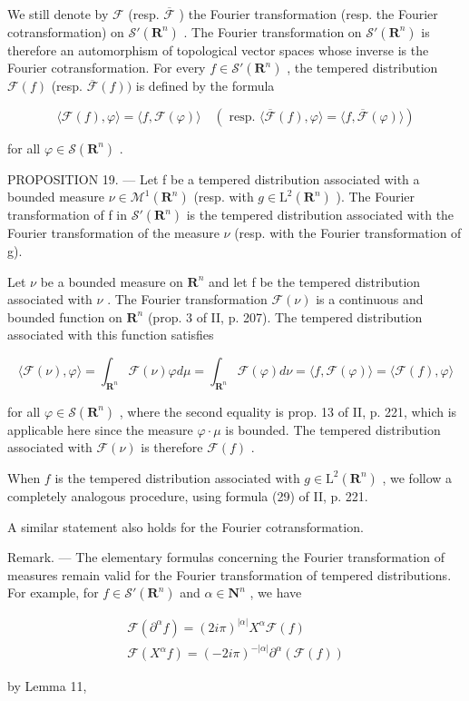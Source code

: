 We still denote by \(\mathcal{F}\) (resp. \(\overline{\mathcal{F}}\) ) the Fourier transformation (resp. the Fourier cotransformation) on \(\mathcal{S}'(\mathbf{R}^n)\) . The Fourier transformation on \(\mathcal{S}'(\mathbf{R}^n)\) is therefore an automorphism of topological vector spaces whose inverse is the Fourier cotransformation. For every \(f \in \mathcal{S}'(\mathbf{R}^n)\) , the tempered distribution \(\mathcal{F}(f)\) (resp. \(\overline{\mathcal{F}}(f) )\) is defined by the formula

\[
\langle \mathcal {F} (f), \varphi \rangle = \langle f, \mathcal {F} (\varphi) \rangle \quad (\text { resp. } \langle \overline {{\mathcal {F}}} (f), \varphi \rangle = \langle f, \overline {{\mathcal {F}}} (\varphi) \rangle)
\]

for all \(\varphi\in\mathcal{S}(\mathbf{R}^{n})\) .

PROPOSITION 19. --- Let f be a tempered distribution associated with a bounded measure \(\nu \in \mathcal{M}^{1}(\mathbf{R}^{n})\) (resp. with \(g \in \mathrm{L}^{2}(\mathbf{R}^{n})\) ). The Fourier transformation of f in \(\mathcal{S}'(\mathbf{R}^{n})\) is the tempered distribution associated with the Fourier transformation of the measure \(\nu\) (resp. with the Fourier transformation of g).

Let \(\nu\) be a bounded measure on \(\mathbf{R}^{n}\) and let f be the tempered distribution associated with \(\nu\) . The Fourier transformation \(\mathcal{F}(\nu)\) is a continuous and bounded function on \(\mathbf{R}^{n}\) (prop. 3 of II, p. 207). The tempered distribution associated with this function satisfies

\[
\langle \mathcal {F} (\nu), \varphi \rangle = \int_ {\mathbf {R} ^ {n}} \mathcal {F} (\nu) \varphi d \mu = \int_ {\mathbf {R} ^ {n}} \mathcal {F} (\varphi) d \nu = \langle f, \mathcal {F} (\varphi) \rangle = \langle \mathcal {F} (f), \varphi \rangle
\]

for all \(\varphi\in\mathcal{S}(\mathbf{R}^{n})\) , where the second equality is prop. 13 of II, p. 221, which is applicable here since the measure \(\varphi\cdot\mu\) is bounded. The tempered distribution associated with \(\mathcal{F}(\nu)\) is therefore \(\mathcal{F}(f)\) .

When \(f\) is the tempered distribution associated with \(g \in \mathrm{L}^2(\mathbf{R}^n)\) , we follow a completely analogous procedure, using formula (29) of II, p. 221.

A similar statement also holds for the Fourier cotransformation.

Remark. --- The elementary formulas concerning the Fourier transformation of measures remain valid for the Fourier transformation of tempered distributions. For example, for \(f \in \mathcal{S}'(\mathbf{R}^{n})\) and \(\alpha \in \mathbf{N}^{n}\) , we have

\[
\begin{array}{l} \mathcal {F} (\partial^ {\alpha} f) = (2 i \pi) ^ {| \alpha |} X ^ {\alpha} \mathcal {F} (f) \\ \mathcal {F} (X ^ {\alpha} f) = (- 2 i \pi) ^ {- | \alpha |} \partial^ {\alpha} (\mathcal {F} (f)) \end{array}
\]

by Lemma 11,

